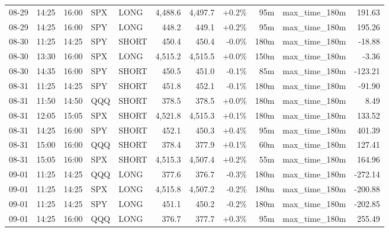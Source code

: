 \documentclass[11pt,a4paper,twoside]{article}
\begin{document}
\begin{center}
\begin{longtable}{>{\color{txtmain}}l l l l l r r r r >{\color{txtmain}}l r}
08-29 & 14:25 & 16:00 & SPX & LONG & 4,488.6 & 4,497.7 & \textcolor{wingreen}{+0.2\%} & 95m & max\_time\_180m & \textcolor{wingreen}{191.63} \\
08-29 & 14:25 & 16:00 & SPY & LONG & 448.2 & 449.1 & \textcolor{wingreen}{+0.2\%} & 95m & max\_time\_180m & \textcolor{wingreen}{195.26} \\
08-30 & 11:25 & 14:25 & SPY & SHORT & 450.4 & 450.4 & \textcolor{lossred}{-0.0\%} & 180m & max\_time\_180m & \textcolor{lossred}{-18.88} \\
08-30 & 13:30 & 16:00 & SPX & LONG & 4,515.2 & 4,515.5 & \textcolor{wingreen}{+0.0\%} & 150m & max\_time\_180m & \textcolor{lossred}{-3.36} \\
08-30 & 14:35 & 16:00 & SPY & SHORT & 450.5 & 451.0 & \textcolor{lossred}{-0.1\%} & 85m & max\_time\_180m & \textcolor{lossred}{-123.21} \\
08-31 & 11:25 & 14:25 & SPY & SHORT & 451.8 & 452.1 & \textcolor{lossred}{-0.1\%} & 180m & max\_time\_180m & \textcolor{lossred}{-91.90} \\
08-31 & 11:50 & 14:50 & QQQ & SHORT & 378.5 & 378.5 & \textcolor{wingreen}{+0.0\%} & 180m & max\_time\_180m & \textcolor{wingreen}{8.49} \\
08-31 & 12:05 & 15:05 & SPX & SHORT & 4,521.8 & 4,515.3 & \textcolor{wingreen}{+0.1\%} & 180m & max\_time\_180m & \textcolor{wingreen}{133.52} \\
08-31 & 14:25 & 16:00 & SPY & SHORT & 452.1 & 450.3 & \textcolor{wingreen}{+0.4\%} & 95m & max\_time\_180m & \textcolor{wingreen}{401.39} \\
08-31 & 15:00 & 16:00 & QQQ & SHORT & 378.4 & 377.9 & \textcolor{wingreen}{+0.1\%} & 60m & max\_time\_180m & \textcolor{wingreen}{127.41} \\
08-31 & 15:05 & 16:00 & SPX & SHORT & 4,515.3 & 4,507.4 & \textcolor{wingreen}{+0.2\%} & 55m & max\_time\_180m & \textcolor{wingreen}{164.96} \\
09-01 & 11:25 & 14:25 & QQQ & LONG & 377.6 & 376.7 & \textcolor{lossred}{-0.3\%} & 180m & max\_time\_180m & \textcolor{lossred}{-272.14} \\
09-01 & 11:25 & 14:25 & SPX & LONG & 4,515.8 & 4,507.2 & \textcolor{lossred}{-0.2\%} & 180m & max\_time\_180m & \textcolor{lossred}{-200.88} \\
09-01 & 11:25 & 14:25 & SPY & LONG & 451.1 & 450.2 & \textcolor{lossred}{-0.2\%} & 180m & max\_time\_180m & \textcolor{lossred}{-202.85} \\
09-01 & 14:25 & 16:00 & QQQ & LONG & 376.7 & 377.7 & \textcolor{wingreen}{+0.3\%} & 95m & max\_time\_180m & \textcolor{wingreen}{255.49} \\

\end{longtable}
\end{center}
\end{document}
